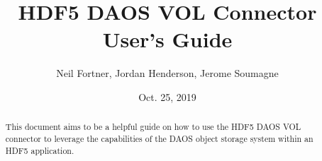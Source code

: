 \documentclass[letterpaper,hyper]{THG_Guide}
\title{HDF5 DAOS VOL Connector User's Guide}
\author{Neil Fortner, Jordan Henderson, Jerome Soumagne}
\date{Oct. 25, 2019}
\begin{document}
\maketitle

\begin{abstract}
This document aims to be a helpful guide on how to use the HDF5 DAOS VOL connector to leverage the capabilities of the DAOS object storage system within an HDF5 application.
\end{abstract}


\makerevisions

\tableofcontents
\newpage


\end{document}
